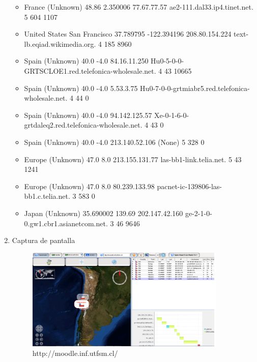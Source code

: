 \documentclass{article}
\begin{document}
\begin{enumerate}
\begin{itemize}
\item France	(Unknown)	48.86	2.350006	77.67.77.57	ae2-111.dal33.ip4.tinet.net.	5	604	1107
\item United States	San Francisco	37.789795	-122.394196	208.80.154.224	text-lb.eqiad.wikimedia.org.	4	185	8960
\item Spain	(Unknown)	40.0	-4.0	84.16.11.250	Hu0-5-0-0-GRTSCLOE1.red.telefonica-wholesale.net.	4	43	10665
\item Spain	(Unknown)	40.0	-4.0	5.53.3.75	Hu0-7-0-0-grtmiabr5.red.telefonica-wholesale.net.	4	44	0
\item Spain	(Unknown)	40.0	-4.0	94.142.125.57	Xe-0-1-6-0-grtdaleq2.red.telefonica-wholesale.net.	4	43	0
\item Spain	(Unknown)	40.0	-4.0	213.140.52.106	(None)	5	328	0
\item Europe	(Unknown)	47.0	8.0	213.155.131.77	las-bb1-link.telia.net.	5	43	1241
\item Europe	(Unknown)	47.0	8.0	80.239.133.98	pacnet-ic-139806-las-bb1.c.telia.net.	3	583	0
\item Japan	(Unknown)	35.690002	139.69	202.147.42.160	ge-2-1-0-0.gw1.cbr1.asianetcom.net.	3	46	9646




\end{itemize}

\item Captura de pantalla\\

\begin{figure}[!ht]  
\begin{center} 
\includegraphics[width=0.9\textwidth]{pantalla1.png} 
\caption{http://moodle.inf.utfsm.cl/}
\end{center}
\end{figure}


\end{enumerate}
\end{document}
